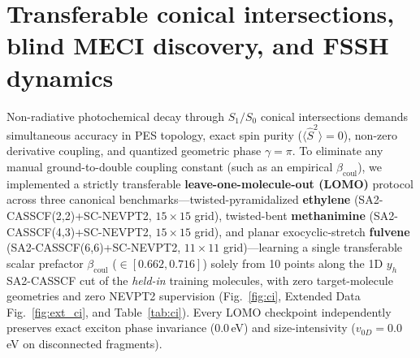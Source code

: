 \documentclass[10pt,twocolumn]{article}
\theoremstyle{natthm}
\newcommand{\Ssq}{\langle\hat{S}^2\rangle}
\begin{document}
\section*{Transferable conical intersections, blind MECI discovery, and FSSH dynamics}
Non-radiative photochemical decay through $S_1/S_0$ conical intersections demands simultaneous accuracy in PES topology, exact spin purity ($\Ssq=0$), non-zero derivative coupling, and quantized geometric phase $\gamma=\pi$\cite{yarkony1996,domcke2004,levine2006,gozem2017}.
To eliminate any manual ground-to-double coupling constant (such as an empirical $\beta_{\mathrm{coul}}$), we implemented a strictly transferable \textbf{leave-one-molecule-out (LOMO)} protocol across three canonical benchmarks---twisted-pyramidalized \textbf{ethylene} (SA2-CASSCF(2,2)+SC-NEVPT2, $15\times 15$ grid), twisted-bent \textbf{methanimine} (SA2-CASSCF(4,3)+SC-NEVPT2, $15\times 15$ grid), and planar exocyclic-stretch \textbf{fulvene} (SA2-CASSCF(6,6)+SC-NEVPT2, $11\times 11$ grid)---learning a single transferable scalar prefactor $\beta_{\mathrm{coul}}$ ($\in [0.662,0.716]$) solely from 10 points along the 1D $y_h$ SA2-CASSCF cut of the \emph{held-in} training molecules, with zero target-molecule geometries and zero NEVPT2 supervision (Fig.~\ref{fig:ci}, Extended Data Fig.~\ref{fig:ext_ci}, and Table~\ref{tab:ci}).
Every LOMO checkpoint independently preserves exact exciton phase invariance ($0.0$\,eV) and size-intensivity ($v_{0D}=0.0$\,eV on disconnected fragments).
\end{document}
